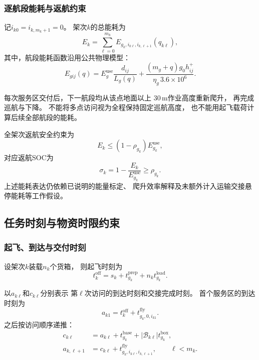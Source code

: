 \documentclass[bwprint]{gmcmthesis}
\begin{document}
\subsubsection{逐航段能耗与返航约束}

记$i_{k0}=i_{k,m_k+1}=0$。
架次$k$的总能耗为
\begin{equation}
    E_k
    =
    \sum_{\ell=0}^{m_k}
    E_{g_k,i_{k\ell},i_{k,\ell+1}}(q_{k\ell}),
    \label{eq:q2_sortie_energy}
\end{equation}
其中，航段能耗函数沿用公共物理模型：
\begin{equation}
    E_{gij}(q)
    =
    E_g^{\mathrm{use}}\frac{d_{ij}}{L_g(q)}
    +
    \frac{(m_g+q)g_0h_{ij}^{+}}
    {\eta_g\,3.6\times10^6}.
\end{equation}

每次服务区交付后，下一航段均从该点地面以上
$30\,\mathrm{m}$作业高度重新爬升，
再完成巡航与下降。
不能将多点访问视为全程保持固定巡航高度，
也不能用起飞载荷计算后续全部航段的能耗。

全架次返航安全约束为
\begin{equation}
    E_k
    \leq
    (1-\rho_{g_k})E_{g_k}^{\mathrm{use}},
\end{equation}
对应返航SOC为
\begin{equation}
    \sigma_k
    =
    1-\frac{E_k}{E_{g_k}^{\mathrm{use}}}
    \geq \rho_{g_k}.
\end{equation}
上述能耗表达仍依赖已说明的能量标定、
爬升效率解释及未额外计入运输交接悬停能耗等工作假设。

\subsection{任务时刻与物资时限约束}

\subsubsection{起飞、到达与交付时刻}

设架次$k$装载$n_k$个货箱，
则起飞时刻为
\begin{equation}
    t_k^{\mathrm{off}}
    =
    s_k+t_{g_k}^{\mathrm{prep}}
    +n_k t_{g_k}^{\mathrm{load}}.
\end{equation}

以$a_{k\ell}$和$c_{k\ell}$分别表示
第$\ell$次访问的到达时刻和交接完成时刻。
首个服务区的到达时刻为
\begin{equation}
    a_{k1}
    =
    t_k^{\mathrm{off}}
    +
    t_{g_k,0,i_{k1}}^{\mathrm{fly}}.
\end{equation}
之后按访问顺序递推：
\begin{align}
    c_{k\ell}
    &=
    a_{k\ell}
    +t_{g_k}^{\mathrm{base}}
    +|\mathcal{B}_{k\ell}|t_{g_k}^{\mathrm{box}},\\
    a_{k,\ell+1}
    &=
    c_{k\ell}
    +t_{g_k,i_{k\ell},i_{k,\ell+1}}^{\mathrm{fly}},
    \qquad \ell<m_k.
\end{align}
\end{document}
